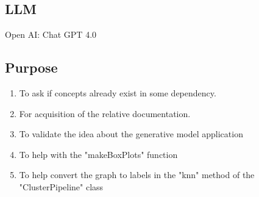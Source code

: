 \documentclass[12pt, a4paper]{article}
\begin{document}
\begin{multicols}{2}
            \subsection{LLM} \label{subsec:llms}

            Open AI: Chat GPT 4.0 \cite{noauthor_chatgpt_nodate}

            \subsection{Purpose} \label{subsec:llmUse}

            \begin{enumerate} \label{enm:llm}
                \item To ask if concepts already exist in some dependency.
                \item For acquisition of the relative documentation.
                \item To validate the idea about the generative model application
                \item To help with the "makeBoxPlots" function
                \item To help convert the graph to labels in the "knn" method of the "ClusterPipeline" class
            \end{enumerate}


        \printbibliography

    \end{multicols}
\end{document}
